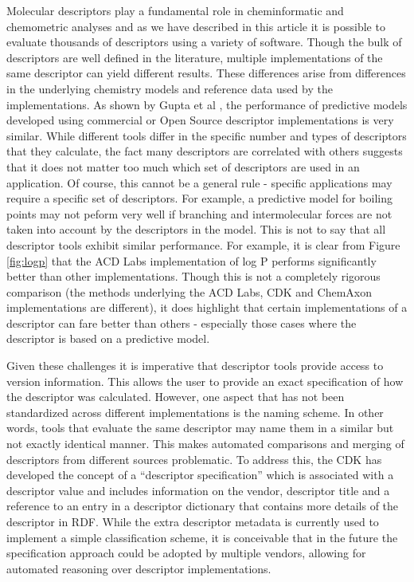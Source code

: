 \documentclass[letterpaper, 12pt]{article}
\begin{document}
Molecular descriptors play a fundamental role in cheminformatic and
chemometric analyses and as we have described in this article it is
possible to evaluate thousands of descriptors using a variety of
software. Though the bulk of descriptors are well defined in the
literature, multiple implementations of the same descriptor can yield
different results. These differences arise from differences in the
underlying chemistry models and reference data used by the
implementations. As shown by Gupta et al \cite{Gupta:2010uq}, the
performance of predictive models developed using commercial or Open
Source descriptor implementations is very similar. While different
tools differ in the specific number and types of descriptors that they
calculate, the fact many descriptors are correlated with others
suggests that it does not matter too much which set of descriptors are
used in an application. Of course, this cannot be a general rule -
specific applications may require a specific set of descriptors. For
example, a predictive model for boiling points may not peform very
well if branching and intermolecular forces are not taken into account
by the descriptors in the model. This is not to say that all
descriptor tools exhibit similar performance. For example, it is clear
from Figure \ref{fig:logp} that the ACD Labs implementation of log P
performs significantly better than other implementations. Though this
is not a completely rigorous comparison (the methods underlying the
ACD Labs, CDK and ChemAxon implementations are different), it does
highlight that certain implementations of a descriptor can fare better
than others - especially those cases where the descriptor is based on
a predictive model.

Given these challenges it is imperative that descriptor tools provide
access to version information. This allows the user to provide an
exact specification of how the descriptor was calculated. However, one
aspect that has not been standardized across different implementations
is the naming scheme. In other words, tools that evaluate the same
descriptor may name them in a similar but not exactly identical
manner. This makes automated comparisons and merging of descriptors
from different sources problematic. To address this, the CDK has developed
the concept of a ``descriptor specification'' which is associated with
a descriptor value and includes information on the vendor, descriptor
title and a reference to an entry in a descriptor dictionary that
contains more details of the descriptor in RDF. While the extra
descriptor metadata is currently used to implement a simple
classification scheme, it is conceivable that in the future the
specification approach could be adopted by multiple vendors, allowing
for automated reasoning over descriptor implementations.
\end{document}
